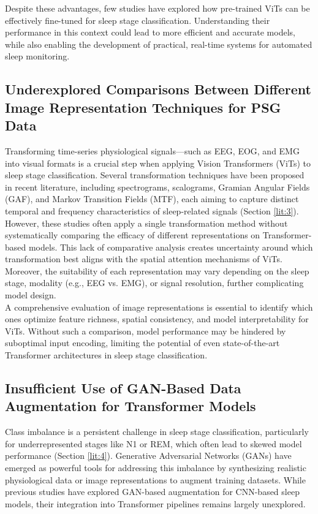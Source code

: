 Despite these advantages, few studies have explored how pre-trained ViTs can be effectively fine-tuned for sleep stage classification. Understanding their performance in this context could lead to more efficient and accurate models, while also enabling the development of practical, real-time systems for automated sleep monitoring.

\subsection{Underexplored Comparisons Between Different Image Representation Techniques for PSG Data}
\label{lit:52}

Transforming time-series physiological signals—such as EEG, EOG, and EMG into visual formats is a crucial step when applying Vision Transformers (ViTs) to sleep stage classification. Several transformation techniques have been proposed in recent literature, including spectrograms, scalograms, Gramian Angular Fields (GAF), and Markov Transition Fields (MTF), each aiming to capture distinct temporal and frequency characteristics of sleep-related signals (Section \ref{lit:3}). \\

However, these studies often apply a single transformation method without systematically comparing the efficacy of different representations on Transformer-based models. This lack of comparative analysis creates uncertainty around which transformation best aligns with the spatial attention mechanisms of ViTs. Moreover, the suitability of each representation may vary depending on the sleep stage, modality (e.g., EEG vs. EMG), or signal resolution, further complicating model design. \\

A comprehensive evaluation of image representations is essential to identify which ones optimize feature richness, spatial consistency, and model interpretability for ViTs. Without such a comparison, model performance may be hindered by suboptimal input encoding, limiting the potential of even state-of-the-art Transformer architectures in sleep stage classification.

\subsection{Insufficient Use of GAN-Based Data Augmentation for Transformer Models}
\label{lit:53}

Class imbalance is a persistent challenge in sleep stage classification, particularly for underrepresented stages like N1 or REM, which often lead to skewed model performance (Section \ref{lit:4}). Generative Adversarial Networks (GANs) have emerged as powerful tools for addressing this imbalance by synthesizing realistic physiological data or image representations to augment training datasets. While previous studies have explored GAN-based augmentation for CNN-based sleep models, their integration into Transformer pipelines remains largely unexplored. \\

